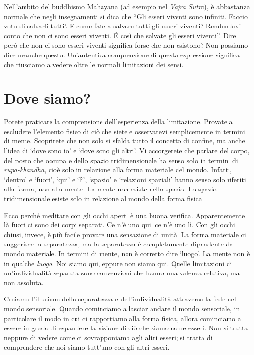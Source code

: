 Nell'ambito del buddhismo Mahāyāna (ad esempio nel \textit{Vajra Sūtra}), è abbastanza normale che negli insegnamenti si dica che ``Gli esseri viventi sono infiniti. Faccio voto di salvarli tutti'. E come fate a salvare tutti gli esseri viventi? Rendendovi conto che non ci sono esseri viventi. É così che salvate gli esseri viventi''. Dire però che non ci sono esseri viventi significa forse che non esistono? Non possiamo dire neanche questo. Un'autentica comprensione di questa espressione significa che riusciamo a vedere oltre le normali limitazioni dei sensi.

\section*{Dove siamo?}

Potete praticare la comprensione dell'esperienza della limitazione. Provate a escludere l'elemento fisico di ciò che siete e osservatevi semplicemente in termini di mente. Scoprirete che non solo si sfalda tutto il concetto di confine, ma anche l'idea di `dove sono io' e `dove sono gli altri'. Vi accorgerete che parlare del corpo, del posto che occupa e dello spazio tridimensionale ha senso solo in termini di \textit{rūpa-khandha}, cioè solo in relazione alla forma materiale del mondo. Infatti, `dentro' e `fuori', `qui' e `lì', `spazio' e `relazioni spaziali' hanno senso solo riferiti alla forma, non alla mente. La mente non esiste nello spazio. Lo spazio tridimensionale esiste solo in relazione al mondo della forma fisica.

Ecco perché meditare con gli occhi aperti è una buona verifica. Apparentemente là fuori ci sono dei corpi separati. Ce n'è uno qui, ce n'è uno lì. Con gli occhi chiusi, invece, è più facile provare una sensazione di unità. La forma materiale ci suggerisce la separatezza, ma la separatezza è completamente dipendente dal mondo materiale. In termini di mente, non è corretto dire `luogo'. La mente non è in qualche\textit{ luogo. }Noi siamo qui, eppure non siamo qui. Quelle limitazioni di un'individualità separata sono convenzioni che hanno una valenza relativa, ma non assoluta.

Creiamo l'illusione della separatezza e dell'individualità attraverso la fede nel mondo sensoriale. Quando cominciamo a lasciar andare il mondo sensoriale, in particolare il modo in cui ci rapportiamo alla forma fisica, allora cominciamo a essere in grado di espandere la visione di ciò che siamo come esseri. Non si tratta neppure di vedere come ci sovrapponiamo agli altri esseri; si tratta di comprendere che noi siamo tutt'uno con gli altri esseri.

